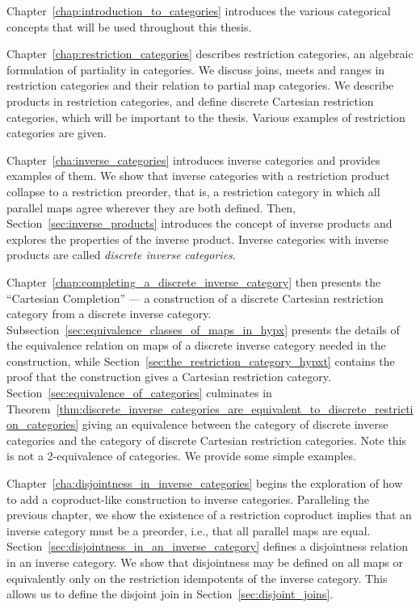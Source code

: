 Chapter~\ref{chap:introduction_to_categories} introduces the various categorical concepts that will
be used throughout this thesis.

Chapter~\ref{chap:restriction_categories} describes restriction categories, an algebraic
formulation of partiality in categories. We discuss joins, meets and ranges in
restriction categories and their relation to partial map categories. We describe products in
restriction categories, and define discrete Cartesian restriction categories, which will be
important to the thesis. Various examples of restriction categories are given.

Chapter~\ref{cha:inverse_categories} introduces inverse categories and provides examples of them. We
show that inverse categories with a restriction product collapse to a restriction preorder, that
is, a restriction category in which all parallel maps agree wherever they are both defined. Then,
Section~\ref{sec:inverse_products} introduces the concept of inverse products and explores the
properties of the inverse product. Inverse categories with inverse products are called
\emph{discrete inverse categories}.

Chapter~\ref{chap:completing_a_discrete_inverse_category} then presents the ``Cartesian
Completion'' --- a construction of a discrete Cartesian restriction category from a discrete
inverse category. Subsection~\ref{sec:equivalence_classes_of_maps_in_hypx} presents the details of the
equivalence relation on  maps of a discrete inverse category needed in the construction, while
Section~\ref{sec:the_restriction_category_hypxt} contains the proof that the construction gives a
Cartesian restriction category. Section~\ref{sec:equivalence_of_categories} culminates in
Theorem~\ref{thm:discrete_inverse_categories_are_equivalent_to_discrete_restriction_categories}
giving an equivalence between the category of discrete inverse categories and the
category of discrete Cartesian restriction categories. Note this is not a 2-equivalence
of categories. We provide some simple examples.


Chapter~\ref{cha:disjointness_in_inverse_categories} begins the exploration of how to add a
coproduct-like construction to inverse categories. Paralleling the previous chapter, we show the
existence of a restriction coproduct implies that an inverse category must be a preorder, i.e.,
that all parallel maps are equal. Section~\ref{sec:disjointness_in_an_inverse_category} defines a
disjointness relation in an inverse category. We show that disjointness may be defined on all maps
or equivalently only on the restriction idempotents of the inverse category. This allows us to
define the disjoint join in Section~\ref{sec:disjoint_joins}.

